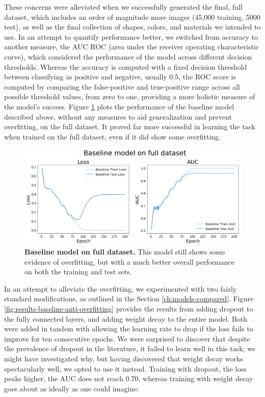 These concerns were alleviated when we successfully generated the final, full dataset, which includes an order of magnitude more images (45,000 training, 5000 test), as well as the final collection of shapes, colors, and materials we intended to use. In an attempt to quantify performance better, we switched from accuracy to another measure, the AUC ROC (area under the receiver operating characteristic curve), which considered the performance of the model across different decision thresholds. Whereas the accuracy is computed with a fixed decision threshold between classifying as positive and negative, usually 0.5, the ROC score is computed by comparing the false-positive and true-positive range across all possible threshold values, from zero to one, providing a more holistic measure of the model’s success. Figure \ref{fig:results-baseline-full-dataset} plots the performance of the baseline model described above, without any measures to aid generalization and prevent overfitting, on the full dataset. It proved far more successful in learning the task when trained on the full dataset, even if it did show some overfitting. 

\begin{figure}[!htb]
\centering
\includegraphics[width=\linewidth]{ch-results/figures/baseline/full_dataset.png}
\caption{{\bf Baseline model on full dataset.} This model still shows some evidence of overfitting, but with a much better overall performance on both the training and test sets.}
\label{fig:results-baseline-full-dataset}
\end{figure}

In an attempt to alleviate the overfitting, we experimented with two fairly standard modifications, as outlined in the Section \ref{ch:models-compared}. Figure \ref{fig:results-baseline-anti-overfitting} provides the results from adding dropout to the fully connected layers, and adding weight decay to the entire model. Both were added in tandem with allowing the learning rate to drop if the loss fails to improve for ten consecutive epochs. We were surprised to discover that despite the prevalence of dropout in the literature, it failed to learn well in this task; we might have investigated why, but having discovered that weight decay works spectacularly well, we opted to use it instead. Training with dropout, the loss peaks higher, the AUC does not reach 0.70, whereas training with weight decay goes about as ideally as one could imagine:

